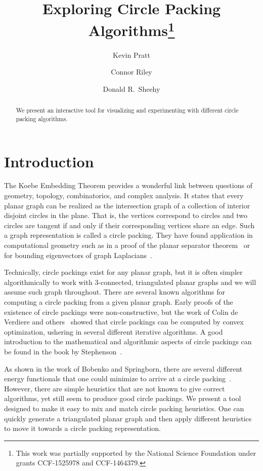 \documentclass[a4paper,UKenglish]{lipics}
\title{Exploring Circle Packing Algorithms\footnote{This work was partially supported by the National Science Foundation under grants CCF-1525978 and CCF-1464379.}}
\author[1]{Kevin Pratt}
\author[2]{Connor Riley}
\author[3]{Donald R.~Sheehy}
\affil[1]{University of Connecticut\\
  \texttt{kevin.pratt@uconn.edu}}
\affil[2]{University of Connecticut\\
  \texttt{connor.riley@uconn.edu}}
\affil[3]{University of Connecticut\\
  \texttt{don.r.sheehy@gmail.com}}
\begin{document}
\maketitle

\begin{abstract}
  We present an interactive tool for visualizing and experimenting with different circle packing algorithms.
\end{abstract}

\section{Introduction} %
\label{sec:introduction}

  The Koebe Embedding Theorem provides a wonderful link between questions of geometry, topology, combinatorics, and complex analysis.
  It states that every planar graph can be realized as the intersection graph of a collection of interior disjoint circles in the plane.
  That is, the vertices correspond to circles and two circles are tangent if and only if their corresponding vertices share an edge.
  Such a graph representation is called a circle packing.
  They have found application in computational geometry such as in a proof of the planar separator theorem~\cite{miller97separators} or for bounding eigenvectors of graph Laplacians~\cite{kelner06spectral}.
  
  Technically, circle packings exist for any planar graph, but it is often simpler algorithmically to work with $3$-connected, triangulated planar graphs and we will assume such graph throughout.
  There are several known algorithms for computing a circle packing from a given planar graph.
  Early proofs of the existence of circle packings were non-constructive, but the work of Colin de Verdiere\cite{colindeverdiere91principe} and others~\cite{mohar93polynomial,bobenko03variational} showed that circle packings can be computed by convex optimization, ushering in several different iterative algorithms.
  A good introduction to the mathematical and algorithmic aspects of circle packings can be found in the book by Stephenson~\cite{stephenson05introduction}.
  
  As shown in the work of Bobenko and Springborn, there are several different energy functionals that one could minimize to arrive at a circle packing~\cite{bobenko03variational}.
  However, there are simple heuristics that are not known to give correct algorithms, yet still seem to produce good circle packings. 
  We present a tool designed to make it easy to mix and match circle packing heuristics. 
  One can quickly generate a triangulated planar graph and then apply different heuristics to move it towards a circle packing representation.
  
\end{document}
